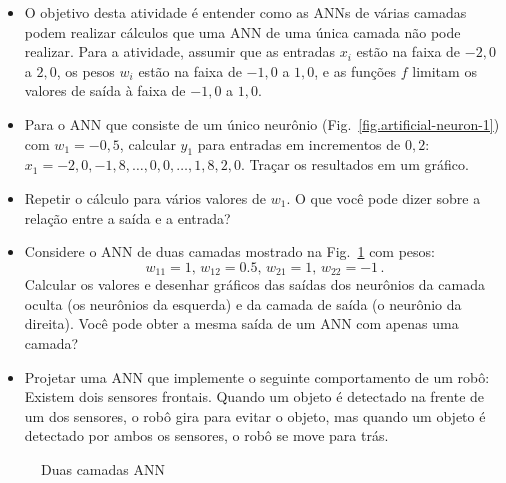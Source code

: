 \begin{framed}
\begin{itemize}
\item O objetivo desta atividade é entender como as ANNs de várias camadas podem realizar cálculos que uma ANN de uma única camada não pode realizar. Para a atividade, assumir que as entradas $x_i$ estão na faixa de $-2,0$ a $2,0$, os pesos $w_i$ estão na faixa de $-1,0$ a $1,0$, e as funções $f$ limitam os valores de saída à faixa de $-1,0$ a $1,0$.
\item Para o ANN que consiste de um único neurônio (Fig.~\ref{fig.artificial-neuron-1}) com $w_1=-0,5$, calcular $y_1$ para entradas em incrementos de $0,2$: $x_1=-2,0, -1,8, \ldots, 0,0, \ldots, 1,8, 2,0$. Traçar os resultados em um gráfico.
\item Repetir o cálculo para vários valores de $w_1$. O que você pode dizer sobre a relação entre a saída e a entrada?
\item Considere o ANN de duas camadas mostrado na Fig.~\ref{fig.two-layer-ann} com pesos:
\[
 w_{11}=1,\, w_{12}=0.5,\, w_{21}=1,\, w_{22}=-1\,. 
\]
Calcular os valores e desenhar gráficos das saídas dos neurônios da camada oculta (os neurônios da esquerda) e da camada de saída (o neurônio da direita). Você pode obter a mesma saída de um ANN com apenas uma camada?
\end{itemize}
\end{framed}
\begin{framed}

\begin{itemize}
\item Projetar uma ANN que implemente o seguinte comportamento de um robô: Existem dois sensores frontais. Quando um objeto é detectado na frente de um dos sensores, o robô gira para evitar o objeto, mas quando um objeto é detectado por ambos os sensores, o robô se move para trás.
\end{itemize}
\end{framed}

\begin{figure}
\begin{center}
\caption{Duas camadas ANN}\label{fig.two-layer-ann}
\end{center}
\end{figure}

